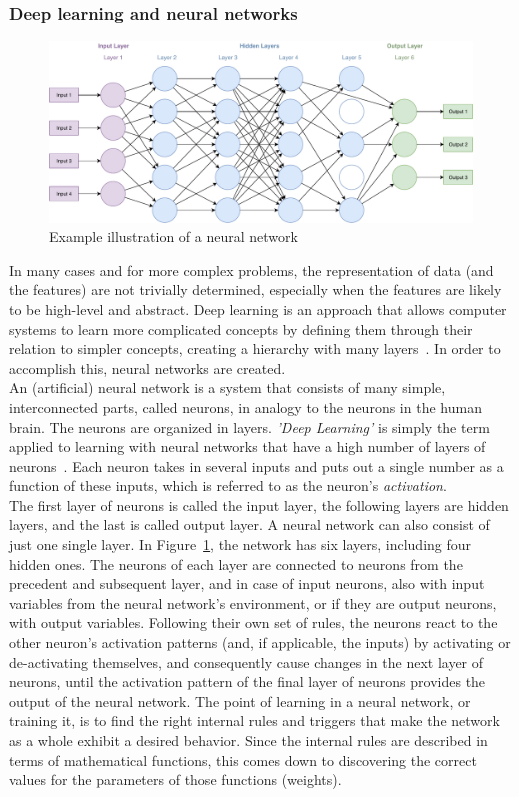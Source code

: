 \documentclass[
a4paper,
pagesize,
pdftex,
12pt,
ngerman,
fleqn,
final,
]{scrartcl}
\begin{document}
	\subsubsection{Deep learning and neural networks}\label{Deep-Learning}
	\begin{figure}[ht]
		\centering
		\includegraphics[width=\linewidth]{img/NeuralNetwork}
		\caption{Example illustration of a neural network}
		\label{fig:neuralnetwork}
	\end{figure}
	In many cases and for more complex problems, the representation of data (and the features) are not trivially determined, especially when the features are likely to be high-level and abstract. Deep learning is an approach that allows computer systems to learn more complicated concepts by defining them through their relation to simpler concepts, creating a hierarchy with many layers~\cite{Goodfellow.2016}.	In order to accomplish this, neural networks are created.\\
	An (artificial) neural network is a system that consists of many simple, interconnected parts, called neurons, in analogy to the neurons in the human brain. The neurons are organized in layers. \textit{'Deep Learning'} is simply the term applied to learning with neural networks that have a high number of layers of neurons~\cite{Nielsen.2015}. Each neuron takes in several inputs and puts out a single number as a function of these inputs, which is referred to as the neuron's \textit{activation}.\\
	The first layer of neurons is called the input layer, the following layers are hidden layers, and the last is called output layer. A neural network can also consist of just one single layer. In Figure~\ref{fig:neuralnetwork}, the network has six layers, including four hidden ones. The neurons of each layer are connected to neurons from the precedent and subsequent layer, and in case of input neurons, also with input variables from the neural network's environment, or if they are output neurons, with output variables. Following their own set of rules, the neurons react to the other neuron's activation patterns (and, if applicable, the inputs) by activating or de-activating themselves, and consequently cause changes in the next layer of neurons, until the activation pattern of the final layer of neurons provides the output of the neural network. The point of learning in a neural network, or training it, is to find the right internal rules and triggers that make the network as a whole exhibit a desired behavior. Since the internal rules are described in terms of mathematical functions, this comes down to discovering the correct values for the parameters of those functions (weights).\\
\end{document}
